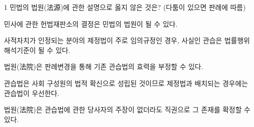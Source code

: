 \begin{question}{1}
민법의 법원(法源)에 관한 설명으로 옳지 않은 것은? (다툼이 있으면 판례에 따름)
\begin{choices}
  \item 민사에 관한 헌법재판소의 결정은 민법의 법원이 될 수 있다.
  \item 사적자치가 인정되는 분야의 제정법이 주로 임의규정인 경우, 사실인 관습은 법률행위 해석기준이 될 수 있다.
  \item 법원(法院)은 판례변경을 통해 기존 관습법의 효력을 부정할 수 있다.
  \item 관습법은 사회 구성원의 법적 확신으로 성립된 것이므로 제정법과 배치되는 경우에는 관습법이 우선한다.
  \item 법원(法院)은 관습법에 관한 당사자의 주장이 없더라도 직권으로 그 존재를 확정할 수 있다.
\end{choices}
\end{question}
